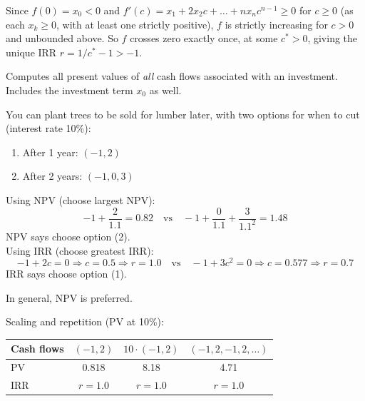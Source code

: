 \begin{center}
\end{center}
Since $f(0) = x_0 < 0$ and $f'(c) = x_1 + 2x_2c + \dots + nx_nc^{n-1} \geq 0$ for $c \geq 0$ (as each $x_k \geq 0$, with at least one strictly positive), $f$ is strictly increasing for $c > 0$ and unbounded above. So $f$ crosses zero exactly once, at some $c^* > 0$, giving the unique IRR $r = 1/c^* - 1 > -1$.

Computes all present values of \textit{all} cash flows associated with an investment. Includes the investment term $x_0$ as well.

\begin{example}
    You can plant trees to be sold for lumber later, with two options for when to cut (interest rate 10\%):
    \begin{enumerate}[label=(\arabic*)]
        \item After 1 year: $(-1,2)$
        \item After 2 years: $(-1,0, 3)$
    \end{enumerate}
    Using NPV (choose largest NPV):
    \[-1 + \frac{2}{1.1} = 0.82 \quad \text{vs} \quad -1 + \frac{0}{1.1} + \frac{3}{1.1^2} = 1.48\]
    NPV says choose option (2).
    \\Using IRR (choose greatest IRR):
    \[-1 + 2c = 0 \Rightarrow c = 0.5 \Rightarrow r = 1.0 \quad \text{vs} \quad -1+3c^2 = 0 \Rightarrow c = 0.577 \Rightarrow r = 0.7\]
    IRR says choose option (1).
\end{example}

In general, NPV is preferred.
\begin{example}
    Scaling and repetition (PV at 10\%):
    \begin{center}
    \begin{tabular}{lccc}
        \toprule
        Cash flows & $(-1,2)$ & $10\cdot(-1,2)$ & $(-1,2,-1,2,\dots)$\\
        \midrule
        PV & 0.818 & 8.18 & 4.71\\
        IRR & $r=1.0$ & $r=1.0$ & $r=1.0$\\
        \bottomrule
    \end{tabular}
    \end{center}
\end{example}

